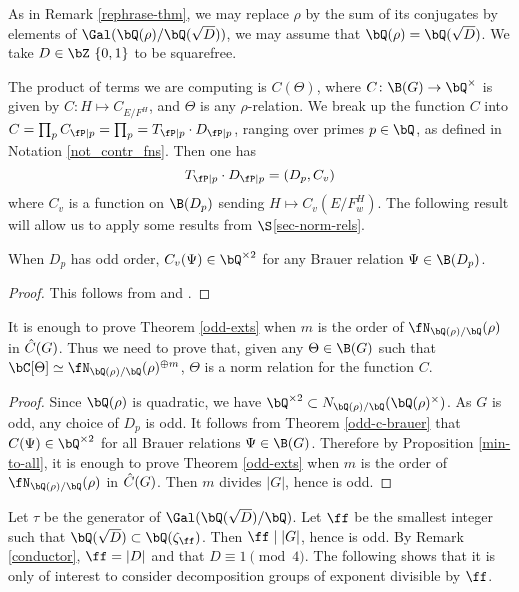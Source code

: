 As in Remark \ref{rephrase-thm}, we may replace $\rho$ by the sum of its conjugates by elements of $ \Gal(\bQ(\rho) / \bQ(\sqrt{D}))$, we may assume that $\bQ(\rho) = \bQ(\sqrt{D})$. We take $D \in \bZ \ \{0,1 \}$ to be squarefree.

The product of terms we are computing is $C(\Theta)$, where $C \colon \B(G) \to \bQ^{\times}$ is given by $C \colon H \mapsto C_{E / F^H}$, and $\Theta$ is any $\rho$-relation.
We break up the function $C$ into $C = \prod_p C_{\fP \mid p} = \prod_p = T_{\fP \mid p} \cdot D_{\fP \mid p}$, ranging over primes $p \in \bQ$,
as defined in Notation \ref{not_contr_fns}.
Then one has
\begin{equation*}\label{Dp-loc}
T_{\fP \mid p} \cdot D_{\fP \mid p} = (D_p, C_v)
\end{equation*}
where $C_v$ is a function on $\B(D_p)$ sending $H \mapsto C_v(E / F_w^H)$. The following result will allow us to apply some results from $\S$\ref{sec-norm-rels}.

\begin{thm}\label{odd-c-brauer}
    When $D_p$ has odd order, $C_v(\Psi) \in \bQ^{\times 2}$ for any Brauer relation $\Psi \in \B(D_p)$. 
\end{thm}

\begin{proof}
    This follows from \cite[Theorem 2.47]{reg-const} and \cite[Theorem 3.2  (Tam)]{reg-const}.
\end{proof}

\begin{cor}
It is enough to prove Theorem \ref{odd-exts} when $m$ is the order of $\repnorm{\rho}$ in $\hat{C}(G)$. Thus we need to prove that, given any $
\Theta \in \B(G)$ such that $\bC[\Theta] \simeq \repnorm{\rho}^{\oplus m}$, $\Theta$ is a norm relation for the function $C$. 
\end{cor}

\begin{proof}
    Since $\bQ(\rho)$ is quadratic, we have $\bQ^{\times 2} \subset \fieldnorm{\rho}$. As $G$ is odd, any choice of $D_p$ is odd. It follows from Theorem \ref{odd-c-brauer} that $C(\Psi) \in \bQ^{\times 2}$ for all Brauer relations $\Psi \in \B(G)$. Therefore by Proposition \ref{min-to-all}, it is enough to prove Theorem \ref{odd-exts} when $m$ is the order of $\repnorm{\rho}$ in $\hat{C}(G)$. Then $m$ divides $|G|$, hence is odd.
\end{proof}

Let $\tau$ be the generator of $\Gal(\bQ(\sqrt{D}) / \bQ)$.
Let $\ff$ be the smallest integer such that $\bQ(\sqrt{D}) \subset \bQ(\zeta_{\ff})$. Then $\ff \mid |G|$, hence is odd. By Remark \ref{conductor}, $\ff = |D|$ and that $D \equiv 1 \pmod 4$. The following shows that it is only of interest to consider decomposition groups of exponent divisible by $\ff$.


